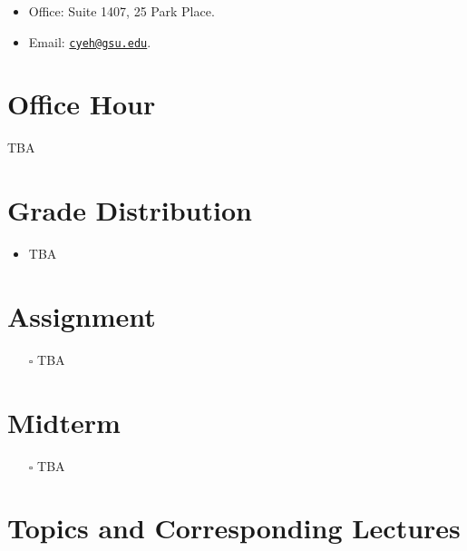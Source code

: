 \documentclass[
  letterpaper,
  DIV=11,
  numbers=noendperiod]{scrreprt}
\providecommand{\tightlist}{%
  \setlength{\itemsep}{0pt}\setlength{\parskip}{0pt}}
\begin{document}
\begin{itemize}
\tightlist
\item
  Office: Suite 1407, 25 Park Place.
\item
  Email: \href{mailto:cyeh@gsu.edu}{\nolinkurl{cyeh@gsu.edu}}.
\end{itemize}

\section*{Office Hour}\label{office-hour}


TBA

\section*{Grade Distribution}\label{grade-distribution}


\begin{itemize}
\tightlist
\item
  TBA
\end{itemize}

\section*{Assignment}\label{assignment}


\begin{itemize}
\tightlist
\item[$\square$]
  TBA
\end{itemize}

\section*{Midterm}\label{midterm}


\begin{itemize}
\tightlist
\item[$\square$]
  TBA
\end{itemize}

\section*{Topics and Corresponding
Lectures}\label{topics-and-corresponding-lectures}
\end{document}

